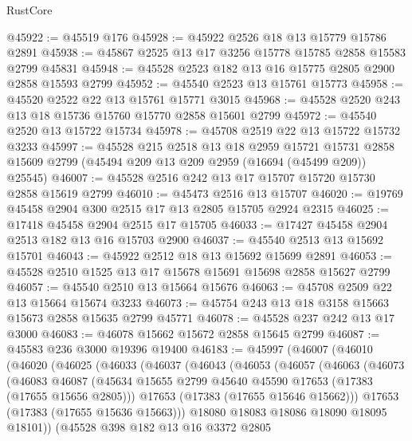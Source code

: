 \begin{lexlean}{RustCore}
\begin{coremodule}
@45922 := @45519 @176
@45928 := @45922 @2526 @18 @13 @15779 @15786 @2891
@45938 := @45867 @2525 @13 @17 @3256 @15778 @15785 @2858 @15583 @2799 @45831
@45948 := @45528 @2523 @182 @13 @16 @15775 @2805 @2900 @2858 @15593 @2799
@45952 := @45540 @2523 @13 @15761 @15773
@45958 := @45520 @2522 @22 @13 @15761 @15771 @3015
@45968 := @45528 @2520 @243 @13 @18 @15736 @15760 @15770 @2858 @15601 @2799
@45972 := @45540 @2520 @13 @15722 @15734
@45978 := @45708 @2519 @22 @13 @15722 @15732 @3233
@45997 := @45528
    @215
    @2518
    @13
    @18
    @2959
    @15721
    @15731
    @2858
    @15609
    @2799
    (@45494 @209 @13 @209 @2959 (@16694 (@45499 @209)) @25545)
@46007 := @45528 @2516 @242 @13 @17 @15707 @15720 @15730 @2858 @15619 @2799
@46010 := @45473 @2516 @13 @15707
@46020 := @19769 @45458 @2904 @300 @2515 @17 @13 @2805 @15705 @2924 @2315
@46025 := @17418 @45458 @2904 @2515 @17 @15705
@46033 := @17427 @45458 @2904 @2513 @182 @13 @16 @15703 @2900
@46037 := @45540 @2513 @13 @15692 @15701
@46043 := @45922 @2512 @18 @13 @15692 @15699 @2891
@46053 := @45528 @2510 @1525 @13 @17 @15678 @15691 @15698 @2858 @15627 @2799
@46057 := @45540 @2510 @13 @15664 @15676
@46063 := @45708 @2509 @22 @13 @15664 @15674 @3233
@46073 := @45754 @243 @13 @18 @3158 @15663 @15673 @2858 @15635 @2799 @45771
@46078 := @45528 @237 @242 @13 @17 @3000
@46083 := @46078 @15662 @15672 @2858 @15645 @2799
@46087 := @45583 @236 @3000 @19396 @19400
@46183 := @45997
    (@46007
      (@46010
        (@46020
          (@46025
            (@46033
              (@46037
                (@46043
                  (@46053
                    (@46057
                      (@46063
                        (@46073
                          (@46083
                            @46087
                            (@45634
                              @15655
                              @2799
                              @45640
                              @45590
                              @17653
                              (@17383 (@17655 @15656 @2805)))
                            @17653
                            (@17383 (@17655 @15646 @15662)))
                          @17653
                          (@17383 (@17655 @15636 @15663)))
                        @18080
                        @18083
                        @18086
                        @18090
                        @18095
                        @18101))
                    (@45528
                      @398
                      @182
                      @13
                      @16
                      @3372
                      @2805

\end{coremodule}
\end{lexlean}
